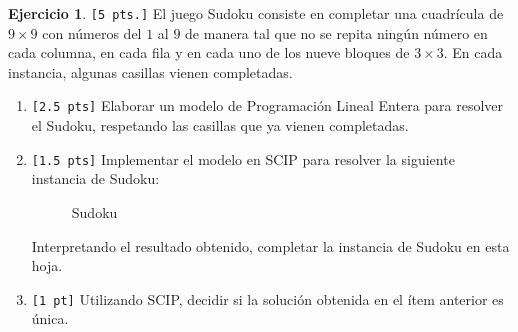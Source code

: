 \documentclass[a4paper,oneside,12pt]{amsart}
\theoremstyle{definition}
\newtheorem{quest}{Ejercicio}
\begin{document}
\begin{quest} 
    \texttt{[5 pts.]} El juego Sudoku consiste en completar una cuadrícula de $9\times 9$ con números del $1$ al $9$ de
    manera tal que no se repita ningún número en cada columna, en cada fila y en cada uno de los nueve bloques de
    $3\times 3$. En cada instancia, algunas casillas vienen completadas.
    \begin{enumerate}[label=\alph*)]
        \item \verb|[2.5 pts]| Elaborar un modelo de Programación Lineal Entera para resolver el Sudoku, respetando
        las casillas que ya vienen completadas.
        \item \verb|[1.5 pts]| Implementar el modelo en SCIP para resolver la siguiente instancia de Sudoku:
        \begin{figure}[h]
            \centering
            \cluefont{\normalsize}
            \caption{Sudoku}\label{fig:ans1}
        \end{figure}

        Interpretando el resultado obtenido, completar la instancia de Sudoku en esta hoja.
        \item \verb|[1 pt]| Utilizando SCIP, decidir si la solución obtenida en el ítem anterior es única.
    \end{enumerate}



\end{quest}


\end{document}
